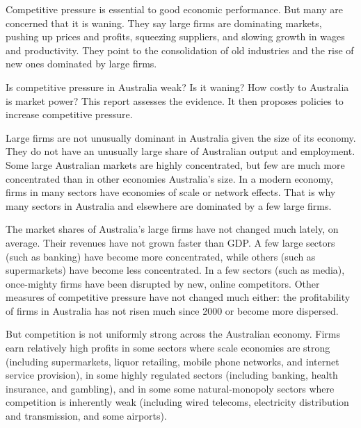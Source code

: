 \begin{overview}

Competitive pressure is essential to good economic performance. But many are concerned that it is waning. They say large firms are dominating markets, pushing up prices and profits, squeezing suppliers, and slowing growth in wages and productivity. They point to the consolidation of old industries and the rise of new ones dominated by large firms.

Is competitive pressure in Australia weak? Is it waning? How costly to Australia is market power? This report assesses the evidence. It then proposes policies to increase competitive pressure. 

Large firms are not unusually dominant in Australia given the size of its economy. They do not have an unusually large share of Australian output and employment. Some large Australian markets are highly concentrated, but few are much more concentrated than in other economies Australia's size. In a modern economy, firms in many sectors have economies of scale or network effects. That is why many sectors in Australia and elsewhere are dominated by a few large firms.

The market shares of Australia's large firms have not changed much lately, on average. Their revenues have not grown faster than GDP\@. A few large sectors (such as banking) have become more concentrated, while others (such as supermarkets) have become less concentrated. In a few sectors (such as media), once-mighty firms have been disrupted by new, online competitors. Other measures of competitive pressure have not changed much either: the profitability of firms in Australia has not risen much since 2000 or become more dispersed. 


But competition is not uniformly strong across the Australian economy. Firms earn relatively high profits in some sectors where scale economies are strong (including supermarkets, liquor retailing, mobile phone networks, and internet service provision), in some highly regulated sectors (including banking, health insurance, and gambling), and in some some natural-monopoly sectors where competition is inherently weak (including wired telecoms, electricity distribution and transmission, and some airports). 
%


\end{overview}
